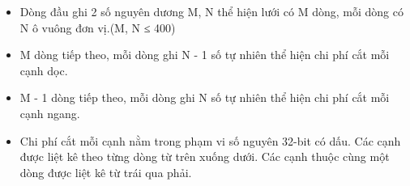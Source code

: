 \begin{itemize}
	\item Dòng đầu ghi 2 số nguyên dương M, N thể hiện lưới có M dòng, mỗi dòng có N ô vuông đơn vị.(M, N ≤ 400)
	\item M dòng tiếp theo, mỗi dòng ghi N - 1 số tự nhiên thể hiện chi phí cắt mỗi cạnh dọc.
	\item M - 1 dòng tiếp theo, mỗi dòng ghi N số tự nhiên thể hiện chi phí cắt mỗi cạnh ngang.
	\item Chi phí cắt mỗi cạnh nằm trong phạm vi số nguyên 32-bit có dấu. Các cạnh được liệt kê theo từng dòng từ trên xuống dưới. Các cạnh thuộc cùng một dòng được liệt kê từ trái qua phải.
\end{itemize}

\